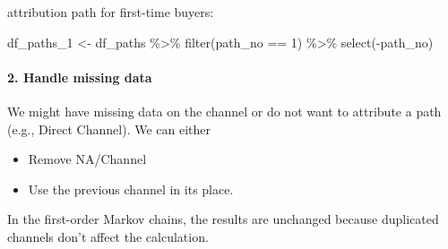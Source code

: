 \documentclass[
]{book}
\newenvironment{Shaded}{\begin{snugshade}}{\end{snugshade}}
\newcommand{\DecValTok}[1]{\textcolor[rgb]{0.00,0.00,0.81}{#1}}
\newcommand{\FunctionTok}[1]{\textcolor[rgb]{0.00,0.00,0.00}{#1}}
\newcommand{\NormalTok}[1]{#1}
\newcommand{\OtherTok}[1]{\textcolor[rgb]{0.56,0.35,0.01}{#1}}
\newcommand{\SpecialCharTok}[1]{\textcolor[rgb]{0.00,0.00,0.00}{#1}}
\providecommand{\tightlist}{%
  \setlength{\itemsep}{0pt}\setlength{\parskip}{0pt}}
\begin{document}
attribution path for first-time buyers:

\begin{Shaded}
\begin{Highlighting}[]
\NormalTok{df\_paths\_1 }\OtherTok{\textless{}{-}}\NormalTok{ df\_paths }\SpecialCharTok{\%\textgreater{}\%}
        \FunctionTok{filter}\NormalTok{(path\_no }\SpecialCharTok{==} \DecValTok{1}\NormalTok{) }\SpecialCharTok{\%\textgreater{}\%}
        \FunctionTok{select}\NormalTok{(}\SpecialCharTok{{-}}\NormalTok{path\_no)}
\end{Highlighting}
\end{Shaded}

\hypertarget{handle-missing-data}{%
\paragraph{2. Handle missing data}\label{handle-missing-data}}

We might have missing data on the channel or do not want to attribute a path (e.g., Direct Channel). We can either

\begin{itemize}
\tightlist
\item
  Remove NA/Channel
\item
  Use the previous channel in its place.
\end{itemize}

In the first-order Markov chains, the results are unchanged because duplicated channels don't affect the calculation.
\end{document}
